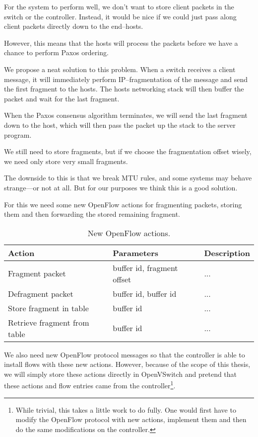 For the system to perform well, we don't want to store client packets in the
switch or the controller.  Instead, it would be nice if we could just pass
along client packets directly down to the end--hosts.

However, this means that the hosts will process the packets before we have a
chance to perform Paxos ordering.

We propose a neat solution to this problem.  When a switch receives a client
message, it will immediately perform IP--fragmentation of the message and
send the first fragment to the hosts.  The hosts networking stack will then
buffer the packet and wait for the last fragment.

When the Paxos consensus algorithm terminates, we will send the last
fragment down to the host, which will then pass the packet up the stack to
the server program.

We still need to store fragments, but if we choose the fragmentation offset
wisely, we need only store very small fragments.

The downside to this is that we break MTU rules, and some systems may behave
strange---or not at all.  But for our purposes we think this is a good
solution.

For this we need some new OpenFlow actions for fragmenting packets, storing
them and then forwarding the stored remaining fragment.

\begin{table}[H]
  \centering
  \begin{tabular}{|l|l|l|}
    \hline \textbf{Action} & \textbf{Parameters} & \textbf{Description} \\
    \hline Fragment packet & buffer id, fragment offset & ... \\
    \hline Defragment packet & buffer id, buffer id & ... \\
    \hline Store fragment in table & buffer id & ... \\
    \hline Retrieve fragment from table & buffer id & ... \\
    \hline
  \end{tabular}

  \caption{New OpenFlow actions.}
  \label{table:openflow.new.actions}
\end{table}

We also need new OpenFlow protocol messages so that the controller is able
to install flows with these new actions.  However, because of the scope of
this thesis, we will simply store these actions directly in OpenVSwitch and
pretend that these actions and flow entries came from the
controller\footnote{While trivial, this takes a little work to do fully.
One would first have to modify the OpenFlow protocol with new actions,
implement them and then do the same modifications on the controller.}.

